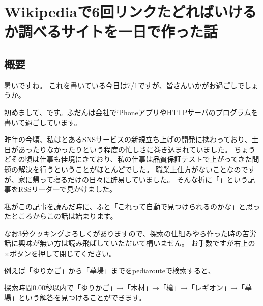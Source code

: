 \section{Wikipediaで6回リンクたどればいけるか調べるサイトを一日で作った話}
\subsection{概要}
暑いですね。
これを書いている今日は7/1ですが、皆さんいかがお過ごしでしょうか。

初めまして、です。ふだんは会社でiPhoneアプリやHTTPサーバのプログラムを書いて過ごしています。

昨年の今頃、私はとあるSNSサービスの新規立ち上げの開発に携わっており、土日があったりなかったりという程度の忙しさに巻き込まれていました。
ちょうどその頃は仕事も佳境にきており、私の仕事は品質保証テストで上がってきた問題の解決を行うということがほとんどでした。
職業上仕方がないことなのですが、家に帰って寝るだけの日々に辟易していました。
そんな折に「」という記事をRSSリーダーで見かけました。

私がこの記事を読んだ時に、ふと「これって自動で見つけられるのかな」と思ったところからこの話は始まります。

なお3分クッキングよろしくがありますので、探索の仕組みやら作った時の苦労話に興味が無い方は読み飛ばしていただいて構いません。
お手数ですが右上の×ボタンを押して閉じてください。

例えば「ゆりかご」から「墓場」までをpediarouteで検索すると、
\begin{figure}
  \centering
\end{figure}
探索時間0.00秒以内で「ゆりかご」→「木材」→「槍」→「レギオン」→「墓場」という解答を見つけることができます。

